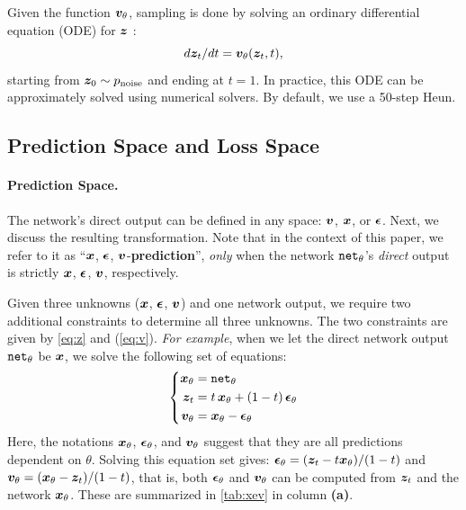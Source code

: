 Given the function $\bm{v}_\theta$, sampling is done by solving an ordinary differential equation (ODE) for $\bm{z}$ \cite{lipman2022flow,liu2022flow,albergo2023building}:
\begin{equation}
{{d\bm{z}_t} / {d t}} = \bm{v}_\theta(\bm{z}_t, t),
\label{eq:ode}
\end{equation}
starting from $\bm{z}_0 \sim p_\text{noise}$ and ending at $t=1$. In practice, this ODE can be approximately solved using numerical solvers. By default, we use a 50-step Heun.


\subsection{Prediction Space and Loss Space}

\paragraph{Prediction Space.}
The network's direct output can be defined in any space: $\bm{v}$, $\bm{x}$, or $\bm{\epsilon}$. Next, we discuss the resulting transformation. Note that in the context of this paper, we refer to it as ``$\bm{x}$, $\bm{\epsilon}$, $\bm{v}$-\textbf{prediction}'', \textit{only} when the network $\text{\texttt{net}}_\theta$'s \textit{direct} output is strictly $\bm{x}$, $\bm{\epsilon}$, $\bm{v}$, respectively.

Given three unknowns ($\bm{x}$, $\bm{\epsilon}$, $\bm{v}$) and one network output, we require two additional constraints to determine all three unknowns. The two constraints are given by \cref{eq:z} and (\ref{eq:v}).
\textit{For example}, when we let the direct network output $\text{\texttt{net}}_\theta$ be $\bm{x}$, we solve the following set of equations:
\vspace{-3pt}
\begin{equation}
\left\{
\begin{aligned}
\x_\theta &= \net_\theta \\
\z_t &= t \, \x_\theta + (1 - t)\, \e_\theta \\
\v_\theta &= \x_\theta - \e_\theta
\end{aligned}
\right.
\label{eq:set_x}
\vspace{-3pt}
\end{equation}
Here, the notations $\bm{x}_\theta$, $\bm{\epsilon}_\theta$, and $\bm{v}_\theta$ suggest that they are all predictions dependent on $\theta$. Solving this equation set gives:
$\bm{\epsilon}_\theta = (\bm{z}_t - t  \bm{x}_\theta) / (1 - t)$ and $\bm{v}_\theta = (\bm{x}_\theta - \bm{z}_t) / (1 - t)$, that is, both $\bm{\epsilon}_\theta$ and $\bm{v}_\theta$ can be computed from $\bm{z}_t$ and the network $\bm{x}_\theta$.
These are summarized in \cref{tab:xev} in column \textbf{(a)}.

